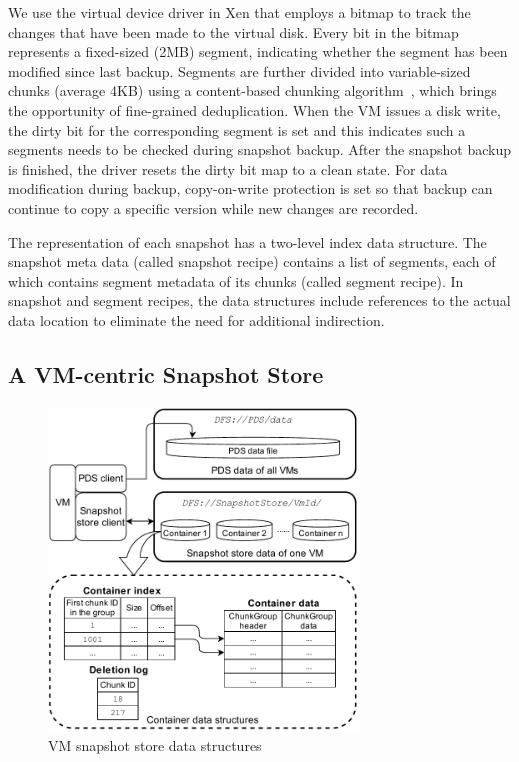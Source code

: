 We use the virtual device driver in Xen that employs a bitmap to track the changes 
that have been made to the virtual disk.
Every bit in the bitmap represents a fixed-sized (2MB) segment, indicating whether the segment
has been modified since last backup. 
Segments are further divided into variable-sized chunks (average 4KB) 
using a content-based chunking algorithm~\cite{frame05}, 
which brings the opportunity of fine-grained deduplication.
When the VM issues a disk write, the dirty bit for the corresponding segment is set
and this indicates such a segments needs to be checked during snapshot backup. 
After the snapshot backup is finished, the driver resets the dirty bit map to a clean state.
For data modification during backup, copy-on-write protection is set so that backup can continue to
copy  a specific version while new changes are recorded.

The representation of each snapshot has  a two-level index data structure.
The snapshot meta data (called snapshot recipe) contains a list of segments, each of which contains segment
metadata of its chunks (called segment recipe).
In snapshot and segment recipes, 
the data structures  include references to the actual data location to eliminate the need for additional indirection.


\subsection{A VM-centric Snapshot Store}
\label{sect:store}

\begin{figure}[htbp]
\vspace{2em}
  \centering
  \includegraphics[width=3.25in]{images/sstore_arch}
  \centering
  \caption{VM snapshot store data structures}
  \label{fig:as_arch}
\end{figure}


